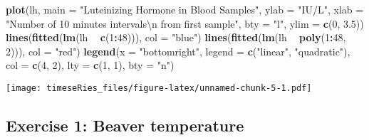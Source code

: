 \documentclass[]{book}
\newenvironment{Shaded}{\begin{snugshade}}{\end{snugshade}}
\newcommand{\KeywordTok}[1]{\textcolor[rgb]{0.13,0.29,0.53}{\textbf{#1}}}
\newcommand{\DataTypeTok}[1]{\textcolor[rgb]{0.13,0.29,0.53}{#1}}
\newcommand{\DecValTok}[1]{\textcolor[rgb]{0.00,0.00,0.81}{#1}}
\newcommand{\FloatTok}[1]{\textcolor[rgb]{0.00,0.00,0.81}{#1}}
\newcommand{\CharTok}[1]{\textcolor[rgb]{0.31,0.60,0.02}{#1}}
\newcommand{\StringTok}[1]{\textcolor[rgb]{0.31,0.60,0.02}{#1}}
\newcommand{\OperatorTok}[1]{\textcolor[rgb]{0.81,0.36,0.00}{\textbf{#1}}}
\newcommand{\NormalTok}[1]{#1}
\begin{document}
\begin{Shaded}
\begin{Highlighting}[]
\KeywordTok{plot}\NormalTok{(lh, }\DataTypeTok{main =} \StringTok{"Luteinizing Hormone in Blood Samples"}\NormalTok{, }\DataTypeTok{ylab =} \StringTok{"IU/L"}\NormalTok{, }\DataTypeTok{xlab =} \StringTok{"Number of 10 minutes intervals}\CharTok{\textbackslash{}n}\StringTok{ from first sample"}\NormalTok{, }
    \DataTypeTok{bty =} \StringTok{"l"}\NormalTok{, }\DataTypeTok{ylim =} \KeywordTok{c}\NormalTok{(}\DecValTok{0}\NormalTok{, }\FloatTok{3.5}\NormalTok{))}
\KeywordTok{lines}\NormalTok{(}\KeywordTok{fitted}\NormalTok{(}\KeywordTok{lm}\NormalTok{(lh }\OperatorTok{~}\StringTok{ }\KeywordTok{c}\NormalTok{(}\DecValTok{1}\OperatorTok{:}\DecValTok{48}\NormalTok{))), }\DataTypeTok{col =} \StringTok{"blue"}\NormalTok{)}
\KeywordTok{lines}\NormalTok{(}\KeywordTok{fitted}\NormalTok{(}\KeywordTok{lm}\NormalTok{(lh }\OperatorTok{~}\StringTok{ }\KeywordTok{poly}\NormalTok{(}\DecValTok{1}\OperatorTok{:}\DecValTok{48}\NormalTok{, }\DecValTok{2}\NormalTok{))), }\DataTypeTok{col =} \StringTok{"red"}\NormalTok{)}
\KeywordTok{legend}\NormalTok{(}\DataTypeTok{x =} \StringTok{"bottomright"}\NormalTok{, }\DataTypeTok{legend =} \KeywordTok{c}\NormalTok{(}\StringTok{"linear"}\NormalTok{, }\StringTok{"quadratic"}\NormalTok{), }\DataTypeTok{col =} \KeywordTok{c}\NormalTok{(}\DecValTok{4}\NormalTok{, }\DecValTok{2}\NormalTok{), }
    \DataTypeTok{lty =} \KeywordTok{c}\NormalTok{(}\DecValTok{1}\NormalTok{, }\DecValTok{1}\NormalTok{), }\DataTypeTok{bty =} \StringTok{"n"}\NormalTok{)}
\end{Highlighting}
\end{Shaded}

\texttt{[image: timeseRies\_files/figure-latex/unnamed-chunk-5-1.pdf]}

\subsection{Exercise 1: Beaver
temperature}\label{exercise-1-beaver-temperature}
\end{document}
